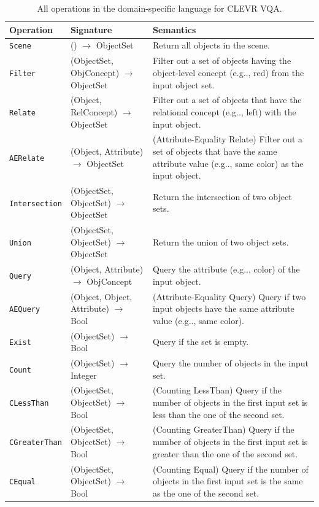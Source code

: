 \documentclass{article} %
\makeatletter
\DeclareRobustCommand\onedot{\futurelet\@let@token\@onedot}
\def\@onedot{\ifx\@let@token.\else.\null\fi\xspace}
\def\eg{e.g\onedot} \def\Eg{E.g\onedot}
\makeatother
\begin{document}
\begin{table}[ht]
    \centering
    \begin{tabular}{llp{}} \toprule
        Operation & Signature & Semantics\\ \midrule
        {\tt Scene} & () $\longrightarrow$ ObjectSet & Return all objects in the scene.\\ \midrule
        {\tt Filter} & (ObjectSet, ObjConcept) $\longrightarrow$ ObjectSet & Filter out a set of objects having the object-level concept (\eg, red) from the input object set. \\ \midrule
        {\tt Relate} & (Object, RelConcept) $\longrightarrow$ ObjectSet & Filter out a set of objects that have the relational concept (\eg, left) with the input object. \\ \midrule
        {\tt AERelate} & (Object, Attribute) $\longrightarrow$ ObjectSet & (Attribute-Equality Relate) Filter out a set of objects that have the same attribute value (\eg, same color) as the input object. \\ \midrule
        {\tt Intersection} & (ObjectSet, ObjectSet) $\longrightarrow$ ObjectSet & Return the intersection of two object sets. \\ \midrule
        {\tt Union} & (ObjectSet, ObjectSet) $\longrightarrow$ ObjectSet & Return the union of two object sets.\\ \midrule
        {\tt Query} & (Object, Attribute) $\longrightarrow$ ObjConcept & Query the attribute (\eg, color) of the input object.\\ \midrule
        {\tt AEQuery} & (Object, Object, Attribute) $\longrightarrow$ Bool & (Attribute-Equality Query) Query if two input objects have the same attribute value (\eg, same color).\\ \midrule
        {\tt Exist} & (ObjectSet) $\longrightarrow$ Bool & Query if the set is empty.\\ \midrule
        {\tt Count} & (ObjectSet) $\longrightarrow$ Integer & Query the number of objects in the input set.\\ \midrule
        {\tt CLessThan} & (ObjectSet, ObjectSet) $\longrightarrow$ Bool & (Counting LessThan) Query if the number of objects in the first input set is less than the one of the second set.\\ \midrule
        {\tt CGreaterThan} & (ObjectSet, ObjectSet) $\longrightarrow$ Bool & (Counting GreaterThan) Query if the number of objects in the first input set is greater than the one of the second set.\\ \midrule
        {\tt CEqual} & (ObjectSet, ObjectSet) $\longrightarrow$ Bool & (Counting Equal) Query if the number of objects in the first input set is the same as the one of the second set.\\ \bottomrule
    \end{tabular}
    \caption{All operations in the domain-specific language for CLEVR VQA.}
    \label{tab:clevr-dsl}
\end{table}
\end{document}
